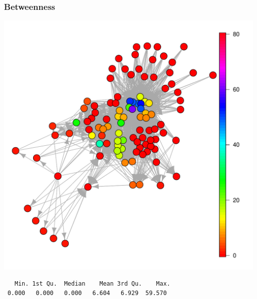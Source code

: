 \documentclass[nopagenumber,9pt]{beamer}
\begin{document}
\begin{frame}[fragile]
 \frametitle{Betweenness}
 
 \begin{center}
  \includegraphics[scale=.3]{plots/chilean_between.pdf}
 \end{center}

\begin{verbatim}
   Min. 1st Qu.  Median    Mean 3rd Qu.    Max. 
 0.000   0.000   0.000   6.604   6.929  59.570
\end{verbatim} 
 
\end{frame}
\end{document}
